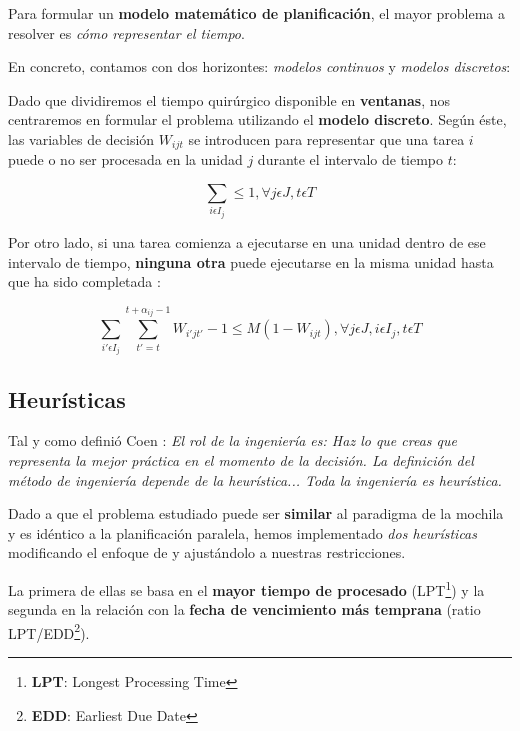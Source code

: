 Para formular un \textbf{modelo matemático de planificación}, el mayor problema a resolver es \textit{cómo representar el tiempo}. 

En concreto, contamos con dos horizontes: \textit{modelos continuos} y \textit{modelos discretos}:


Dado que dividiremos el tiempo quirúrgico disponible en \textbf{ventanas}, nos centraremos en formular el problema utilizando el \textbf{modelo discreto}.
Según éste, las variables de decisión $W_{ijt}$ se introducen para representar que una tarea $i$ puede o no ser procesada en la unidad $j$ durante el intervalo de tiempo $t$:

\begin{equation}
    \sum_{i \epsilon I_{j}} \leq 1, \forall j \epsilon J, t \epsilon T
\end{equation}

Por otro lado, si una tarea comienza a ejecutarse en una unidad dentro de ese intervalo de tiempo, \textbf{ninguna otra} puede ejecutarse en la misma unidad hasta que ha sido completada \cite{Floudas2005MixedApplications}:

\begin{equation}
    \sum_{i'\epsilon I_{j}} \sum_{t' = t}^{t+\alpha_{ij}-1} W_{i'jt'} - 1 \leq M(1-W_{ijt}), \forall j \epsilon J, i \epsilon I_{j}, t \epsilon T
\end{equation}


\subsection{Heurísticas}

Tal y como definió Coen \cite{Koen1984TowardMethod}: \textit{El rol de la ingeniería es: Haz lo que creas que representa la mejor práctica en el momento de la decisión. La definición del método de ingeniería depende de la heurística... Toda la ingeniería es heurística.}

Dado a que el problema estudiado puede ser \textbf{similar} al paradigma de la mochila y es idéntico a la planificación paralela, hemos implementado \textit{dos heurísticas} modificando el enfoque de \cite{Lin2020AScheduling} y ajustándolo a nuestras restricciones.

La primera de ellas se basa en el \textbf{mayor tiempo de procesado} (LPT\footnote{\textbf{LPT}: Longest Processing Time}) y la segunda en la relación con la \textbf{fecha de vencimiento más temprana} (ratio LPT/EDD\footnote{\textbf{EDD}: Earliest Due Date}).

